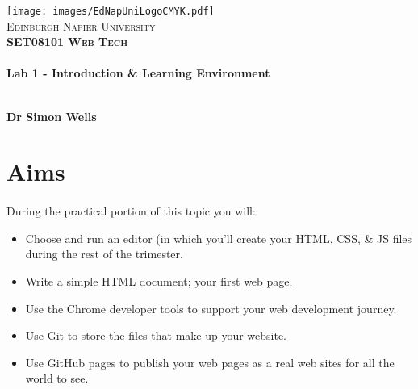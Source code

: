 \documentclass[10pt, a4paper]{article}
\begin{document}

\begin{titlepage}
\vspace*{5cm}
\begin{center}
\texttt{[image: images/EdNapUniLogoCMYK.pdf]}~\\[1cm]

\textsc{\Large Edinburgh Napier University}\\[1.5cm]

\textsc{\LARGE \bfseries SET08101 Web Tech}\\[0.5cm]

\hrulefill \\[0.4cm]
{\huge \bfseries Lab 1 - Introduction \& Learning Environment \\[0.4cm] }
\hrulefill \\[1.5cm]

\begin{minipage}{0.4\textwidth}
\begin{flushleft} \large
\textbf{Dr Simon Wells} \\
\end{flushleft}
\end{minipage}

\vfill

\end{center}
\end{titlepage}




%

\section{Aims}
\paragraph{} During the practical portion of this topic you will:

\begin{itemize}
\item Choose and run an editor (in which you'll create your HTML, CSS, \& JS files during the rest of the trimester.
\item Write a simple HTML document; your first web page.
\item Use the Chrome developer tools to support your web development journey.
\item Use Git to store the files that make up your website.
\item Use GitHub pages to publish your web pages as a real web sites for all the world to see.
\end{itemize}
\end{document}
